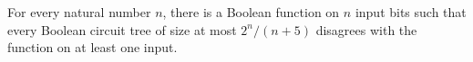 \begin{theorem}
\label{BoolCircuit.exists_hard_function}
\leanok
{}
For every natural number $n$, there is a Boolean function on $n$ input bits such that
every Boolean circuit tree of size at most $2^n/(n+5)$ disagrees with the function on at
least one input.
\end{theorem}
